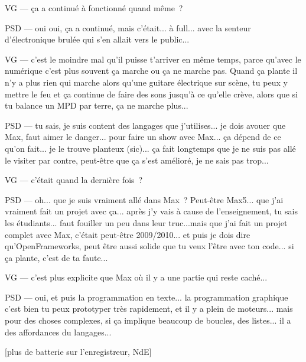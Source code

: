 VG — ça a continué à fonctionné quand même ?

PSD — oui oui, ça a continué, mais c'était... à full... avec la senteur d'électronique brulée qui s'en allait vers le public...

VG — c'est le moindre mal qu'il puisse t'arriver en même temps, parce qu'avec le numérique c'est plus souvent ça marche ou ça ne marche pas. Quand ça plante il n'y a plus rien qui marche alors qu'une guitare électrique sur scène, tu peux y mettre le feu et ça continue de faire des sons jusqu'à ce qu'elle crève, alors que si tu balance un MPD par terre, ça ne marche plus...

PSD — tu sais, je suis content des langages que j'utilises... je dois avouer que Max, faut aimer le danger... pour faire un show avec Max... ça dépend de ce qu'on fait... je le trouve planteux (sic)... ça fait longtemps que je ne suis pas allé le visiter par contre, peut-être que ça s'est amélioré, je ne sais pas trop...

VG — c'était quand la dernière fois ?

PSD — oh... que je suis vraiment allé dans Max ? Peut-être Max5... que j'ai vraiment fait un projet avec ça... après j'y vais à cause de l'enseignement, tu sais les étudiants... faut fouiller un peu dans leur truc...mais que j'ai fait un projet complet avec Max, c'était peut-être 2009/2010... et puis je dois dire qu'OpenFrameworks, peut être aussi solide que tu veux l'être avec ton code... si ça plante, c'est de ta faute...

VG — c'est plus explicite que Max où il y a une partie qui reste caché...

PSD — oui, et puis la programmation en texte... la programmation graphique c'est bien tu peux prototyper très rapidement, et il y a plein de moteurs... mais pour des choses complexes, si ça implique beaucoup de boucles, des listes... il a des affordances du langages...

[plus de batterie sur l'enregistreur, NdE]